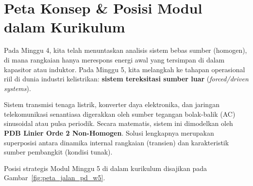 \documentclass[11pt,a4paper]{article}
\theoremstyle{definition}
\begin{document}
\vspace{0.3cm}
\tableofcontents
\vspace{0.5cm}

\newpage

\section{Peta Konsep \& Posisi Modul dalam Kurikulum}

Pada Minggu 4, kita telah menuntaskan analisis sistem bebas sumber (homogen), di mana rangkaian hanya merespons energi awal yang tersimpan di dalam kapasitor atau induktor. Pada Minggu 5, kita melangkah ke tahapan operasional riil di dunia industri kelistrikan: \textbf{sistem tereksitasi sumber luar} (\textit{forced/driven systems}).

Sistem transmisi tenaga listrik, konverter daya elektronika, dan jaringan telekomunikasi senantiasa digerakkan oleh sumber tegangan bolak-balik (AC) sinusoidal atau pulsa periodik. Secara matematis, sistem ini dimodelkan oleh \textbf{PDB Linier Orde 2 Non-Homogen}. Solusi lengkapnya merupakan superposisi antara dinamika internal rangkaian (transien) dan karakteristik sumber pembangkit (kondisi tunak).

Posisi strategis Modul Minggu 5 di dalam kurikulum disajikan pada Gambar~\ref{fig:peta_jalan_pd_w5}.
\end{document}
